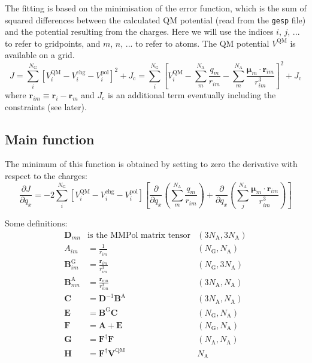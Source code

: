 \documentclass[a4paper]{report}
\newcommand{\bs}{\boldsymbol}
\newcommand{\mr}{\mathrm}
\begin{document}
The fitting is based on the minimisation of the error function, which is the sum of squared differences between the calculated QM potential (read from the \texttt{gesp} file) and the potential resulting from the charges. Here we will use the indices $i$, $j$, ... to refer to gridpoints, and $m$, $n$, ... to refer to atoms. The QM potential $V^\mathrm{QM}$ is available on a grid.
\begin{equation}
\label{E:uno}
  J = \sum_i^{N_\mathrm{G}} \left[ {V}^\mathrm{QM}_i - V^\mr{chg}_i - V^\mr{pol}_i \right]^2 
    + J_\mr{c} 
    = \sum_i^{N_\mathrm{G}} \left[ {V}^\mathrm{QM}_i - \sum_m^{N_\mathrm{A}} \frac{q_m}{r_{im}} 
    - \sum_m^{N_\mathrm{A}} \frac{\bs{\mu}_m \cdot \bs{r}_{im}}{r_{im}^3} \right]^2 + J_\mr{c}
\end{equation}
where $\bs{r}_{im}\equiv\bs{r}_i - \bs{r}_m$ and $J_\mr{c}$ is an additional term
eventually including the constraints (see later).

\subsection*{Main function}

The minimum of this function is obtained by setting to zero the derivative with
respect to the charges:
\begin{equation}
\label{deriv}
  \frac{\partial J}{\partial q_x} = - 2 \sum_i^{N_\mathrm{G}} \left[ {V}^\mathrm{QM}_i 
  - V^\mr{chg}_i - V^\mr{pol}_i \right] \left[ \frac{\partial}{\partial q_x} 
  \left(\sum_m^{N_\mathrm{A}} \frac{q_m}{r_{im}}\right) + \frac{\partial}{\partial q_x} 
  \left(\sum_j^{N_\mathrm{A}} \frac{\bs{\mu}_m \cdot \bs{r}_{im}}{r_{im}^3} \right)\right]
\end{equation}

Some definitions:
\begin{align}
  \bs{D}_{mn} & \text{is the MMPol matrix tensor} & (3 N_\mathrm{A}, 3 N_\mathrm{A})\\
  A_{im} &= \frac{1}{r_{im}} & (N_\mathrm{G}, N_\mathrm{A}) \\
  \bs{B}^\mathrm{G}_{im} &= \frac{\bs{r}_{im}}{r_{im}^3} & (N_\mathrm{G}, 3 N_\mathrm{A}) \\
  \bs{B}^\mathrm{A}_{mn} &= \frac{\bs{r}_{mn}}{r_{mn}^3} & (3 N_\mathrm{A}, N_\mathrm{A}) \\
  \bs{C} &= \bs{D}^{-1}\bs{B}^\mathrm{A} & (3 N_\mathrm{A}, N_\mathrm{A})  \\
  \bs{E} &= \bs{B}^\mathrm{G} \bs{C} & (N_\mathrm{G}, N_\mathrm{A})\\
  \bs{F} &= \bs{A} + \bs{E} & (N_\mathrm{G}, N_\mathrm{A}) \\ 
  \bs{G} &= \bs{F}^\dagger \bs{F} & (N_\mathrm{A}, N_\mathrm{A})\\
  \bs{H} &= \bs{F}^\dagger \bs{V}^\mathrm{QM} & N_\mathrm{A} 
\end{align}
\end{document}
